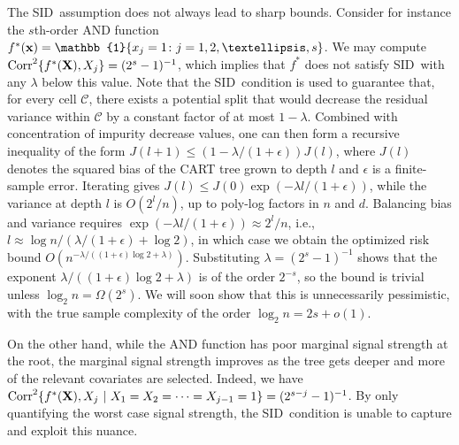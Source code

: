 \documentclass[11pt]{article}
\newcommand{\bx}{\mathbf{x}}
\newcommand{\bX}{\mathbf{X}}
\DeclarePairedDelimiter{\braces}{\lbrace}{\rbrace}
\newcommand{\indicator}{\mathbb{1}}
\newcommand{\cell}{\mathcal{C}}
\newcommand{\sparsity}{s}
\newcommand{\nsamples}{n}
\newcommand{\SID}{\textsf{SID}}
\newcommand{\Corr}{\operatorname{Corr}}
\newcommand{\comment}[2]{{#2}}
\begin{document}
The \SID~assumption does not always lead to sharp bounds.
Consider for instance the $\sparsity$th-order AND function $f^*(\bx) = \indicator\braces*{x_j = 1 \colon j =1,2,\ldots,\sparsity}$.
We may compute $\Corr^2\braces*{f^*(\bX),X_j} = (2^\sparsity-1)^{-1}$, which implies that $f^*$ does not satisfy \SID~with any $\lambda$ below this value. Note that the \SID~condition is used to guarantee that, for every cell $\cell$, there exists a potential split that would decrease the residual variance within $\cell$ by a constant factor of at most $1-\lambda$. 
\comment{red}{Combined with concentration of impurity decrease values, one can then form a recursive inequality of the form $J(l+1) \leq (1-\lambda/(1+\epsilon))J(l)$, where $J(l)$ denotes the squared bias of the CART tree grown to depth $l$ and $\epsilon$ is a finite-sample error. Iterating gives $J(l) \leq J(0)\exp(-\lambda l/(1+\epsilon))$, while the variance at depth $l$ is $O(2^l/n)$, up to poly-log factors in $n$ and $d$. Balancing bias and variance requires $\exp(-\lambda l / (1+\epsilon)) \approx 2^l/n$, i.e., $l \approx \log n / (\lambda/(1+\epsilon) + \log 2)$, in which case we obtain the optimized risk bound $O(n^{-\lambda / ((1+\epsilon)\log 2 + \lambda)})$.  
Substituting $\lambda = (2^\sparsity - 1)^{-1}$ shows that the exponent $\lambda / ((1+\epsilon)\log 2 + \lambda)$ is of the order $2^{-\sparsity}$, so the bound is trivial unless $\log_2 n = \Omega(2^\sparsity)$.}  
We will soon show that this is unnecessarily pessimistic, with the true sample complexity of the order $\log_2 \nsamples = 2\sparsity + o(1)$.




On the other hand, while the AND function has poor marginal signal strength at the root, the marginal signal strength improves as the tree gets deeper and more of the relevant covariates are selected.
Indeed, we have $\Corr^2\braces*{f^*(\bX),X_j~|~X_1=X_2=\cdots=X_{j-1}=1} = (2^{\sparsity-j}-1)^{-1}$.
By only quantifying the worst case signal strength, the \SID~condition is unable to capture and exploit this nuance.
\end{document}
